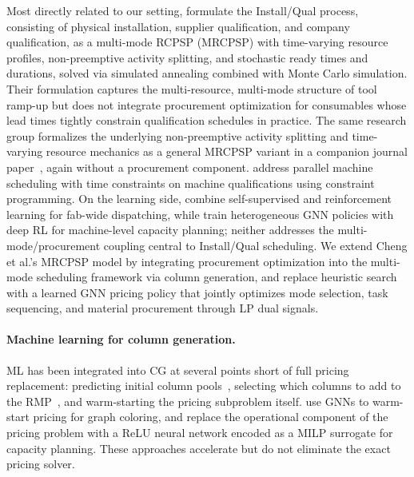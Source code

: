 \documentclass[11pt]{article}
\begin{document}
Most directly related to our setting, \citet{ieee2013semircpsp} formulate the Install/Qual process, consisting of physical installation, supplier qualification, and company qualification, as a multi-mode RCPSP (MRCPSP) with time-varying resource profiles, non-preemptive activity splitting, and stochastic ready times and durations, solved via simulated annealing combined with Monte Carlo simulation.
Their formulation captures the multi-resource, multi-mode structure of tool ramp-up but does not integrate procurement optimization for consumables whose lead times tightly constrain qualification schedules in practice.
The same research group formalizes the underlying non-preemptive activity splitting and time-varying resource mechanics as a general MRCPSP variant in a companion journal paper~\citep{cheng2015splitting}, again without a procurement component.
\citet{bitar2024cpqualification} address parallel machine scheduling with time constraints on machine qualifications using constraint programming.
On the learning side, \citet{park2023semirl} combine self-supervised and reinforcement learning for fab-wide dispatching, while \citet{wang2025semicapacity} train heterogeneous GNN policies with deep RL for machine-level capacity planning; neither addresses the multi-mode/procurement coupling central to Install/Qual scheduling.
We extend Cheng et al.'s MRCPSP model by integrating procurement optimization into the multi-mode scheduling framework via column generation, and replace heuristic search with a learned GNN pricing policy that jointly optimizes mode selection, task sequencing, and material procurement through LP dual signals.

\paragraph{Machine learning for column generation.}
ML has been integrated into CG at several points short of full pricing replacement: predicting initial column pools~\citep{morabit2021machine}, selecting which columns to add to the RMP~\citep{chi2022deep}, and warm-starting the pricing subproblem itself.
\citet{shen2022enhancing} use GNNs to warm-start pricing for graph coloring, and \citet{mlcg2025optoline} replace the operational component of the pricing problem with a ReLU neural network encoded as a MILP surrogate for capacity planning.
These approaches accelerate but do not eliminate the exact pricing solver.
\end{document}
